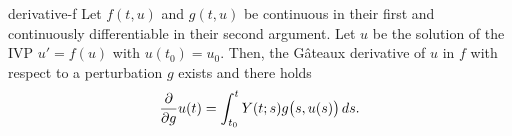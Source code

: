 \begin{Theorem}{derivative-f}
  Let $f(t,u)$ and $g(t,u)$ be continuous in their first and
  continuously differentiable in their second argument. Let $u$ be the
  solution of the IVP $u'=f(u)$ with $u(t_0) = u_0$. Then, the Gâteaux
  derivative of $u$ in $f$ with respect to a perturbation $g$ exists
  and there holds
  \begin{gather}
    \label{eq:derivative-f:1}
    \frac{\partial}{\partial g} u(t)
    = \int_{t_0}^t \fundamental(t;s) g\bigl(s,u(s)\bigr)\,d s.
  \end{gather}
\end{Theorem}
